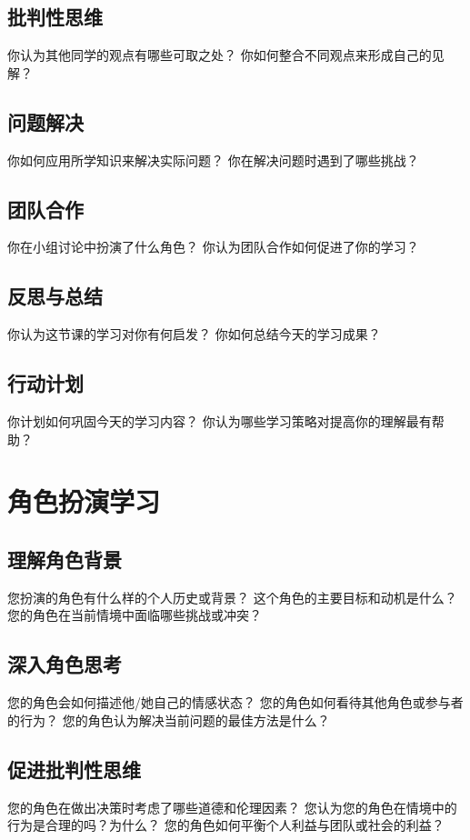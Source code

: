 \documentclass[12pt]{book}
\begin{document}
\subsection{批判性思维}
你认为其他同学的观点有哪些可取之处？
你如何整合不同观点来形成自己的见解？

\subsection{问题解决}
你如何应用所学知识来解决实际问题？
你在解决问题时遇到了哪些挑战？

\subsection{团队合作}
你在小组讨论中扮演了什么角色？
你认为团队合作如何促进了你的学习？

\subsection{反思与总结}
你认为这节课的学习对你有何启发？
你如何总结今天的学习成果？

\subsection{行动计划}
你计划如何巩固今天的学习内容？
你认为哪些学习策略对提高你的理解最有帮助？


\section{角色扮演学习}
\subsection{理解角色背景}
您扮演的角色有什么样的个人历史或背景？
这个角色的主要目标和动机是什么？
您的角色在当前情境中面临哪些挑战或冲突？

\subsection{深入角色思考}
您的角色会如何描述他/她自己的情感状态？
您的角色如何看待其他角色或参与者的行为？
您的角色认为解决当前问题的最佳方法是什么？

\subsection{促进批判性思维}
您的角色在做出决策时考虑了哪些道德和伦理因素？
您认为您的角色在情境中的行为是合理的吗？为什么？
您的角色如何平衡个人利益与团队或社会的利益？
\end{document}
